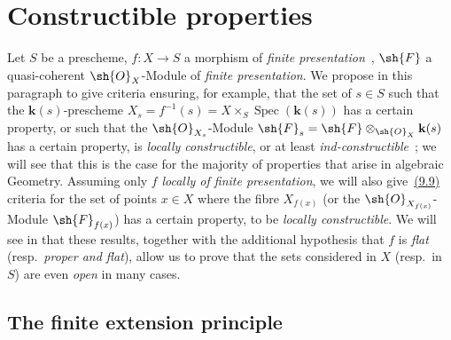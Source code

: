 \section{Constructible properties}
\label{section:IV.9}

Let $S$ be a prescheme, $f:X\to S$ a morphism of \emph{finite presentation}~,
$\sh{F}$ a quasi-coherent $\sh{O}_X$-Module of \emph{finite presentation}.
We propose in this paragraph to give criteria ensuring, for example, that the set of $s\in S$ such that the $\mathbf{k}(s)$-prescheme $X_s=f^{-1}(s)=X\times_S\operatorname{Spec}(\mathbf{k}(s))$ has a certain property, or such that the $\sh{O}_{X_s}$-Module $\sh{F}_s=\sh{F}\otimes_{\sh{O}_X}\mathbf{k}(s)$ has a certain property, is \emph{locally constructible}, or at least \emph{ind-constructible}~; we will see that this is the case for the majority of properties that arise in algebraic Geometry.
Assuming only $f$ \emph{locally of finite presentation}, we will also give~{\hyperlink{ega4.c04.subsec.9-9}{(9.9)}} criteria for the set of points $x\in X$ where the fibre $X_{f(x)}$ (or the $\sh{O}_{X_{f(x)}}$-Module $\sh{F}_{f(x)}$) has a certain property, to be \emph{locally constructible}.
We will see in  that these results, together with the additional hypothesis that $f$ is \emph{flat} (resp.\ \emph{proper and flat}), allow us to prove that the sets considered in $X$ (resp.\ in $S$) are even \emph{open} in many cases.

\subsection{The finite extension principle}
\label{subsection:IV.9.1}


